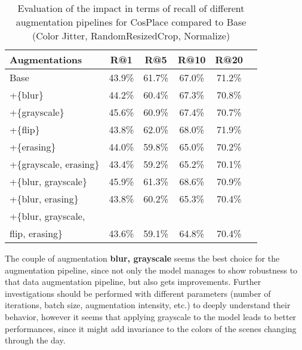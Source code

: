 \documentclass[10pt,twocolumn,letterpaper]{article}
\begin{document}

\begin{table}[hbp] %
\centering %
\begin{tabular}{l c c c c c} %
\toprule %
Augmentations & R@1 & R@5 & R@10 & R@20\\ %
\midrule %
Base & 43.9\%  & 61.7\% & 67.0\% & 71.2\%  \\ 
+\{blur\} & 44.2\%  & 60.4\% & 67.3\% & 70.8\%  \\ 
+\{grayscale\} & 45.6\%  & 60.9\% & 67.4\% & 70.7\%  \\ 
+\{flip\} & 43.8\%  & 62.0\% & 68.0\% & 71.9\%  \\  
+\{erasing\} & 44.0\%  & 59.8\% & 65.0\% & 70.2\%  \\  
+\{grayscale, erasing\} & 43.4\%  & 59.2\% & 65.2\% & 70.1\%  \\  
+\{blur, grayscale\} & 45.9\%  & 61.3\% & 68.6\% & 70.9\%  \\  
+\{blur, erasing\} & 43.8\%  & 60.2\% & 65.3\% & 70.4\%  \\  
+\{blur, grayscale,\\ flip, erasing\} & 43.6\%  & 59.1\% & 64.8\% & 70.4\%  \\  

\bottomrule %
\end{tabular}
\smallskip 
\caption{Evaluation of the impact in terms of recall of different augmentation pipelines for CosPlace compared to Base (Color Jitter, RandomResizedCrop, Normalize)
} %
\label{tab:augmentations-pp} %
\end{table}

The couple of augmentation \textbf{blur, grayscale} seems the best choice for the augmentation pipeline, since not only the model manages to show robustness to that data augmentation pipeline, but also gets improvements.
Further investigations should be performed with different parameters (\eg number of iterations, batch size, augmentation intensity, etc.) to deeply understand their behavior, however it seems that applying grayscale to the model leads to better performances, since it might add invariance to the colors of the scenes changing through the day.
\newline
\end{document}
